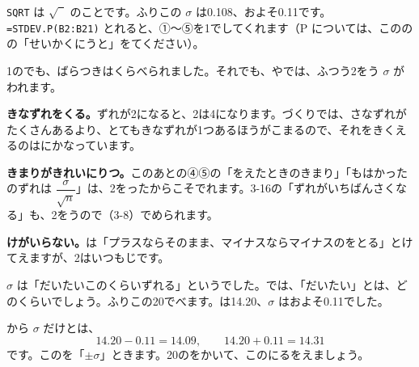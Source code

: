 \texttt{SQRT} は $\sqrt{\phantom{2}}$ のことです。ふりこの $\sigma$ は0.108、およそ0.11です。\texttt{=STDEV.P(B2:B21)} とれると、①〜⑤を1でしてくれます（P については、こののの「せいかくにうと」をてください）。

1のでも、ばらつきはくらべられました。それでも、やでは、ふつう2をう $\sigma$ がわれます。
\begin{enumerate}[label={\bkcircled[bkBlue]{\arabic*}}, leftmargin=2.4\zw, itemsep=1pt, topsep=2pt]
\item \textbf{きなずれをくる。}\quad ずれが2になると、2は4になります。づくりでは、さなずれがたくさんあるより、とてもきなずれが1つあるほうがこまるので、それをきくえるのはにかなっています。
\item \textbf{きまりがきれいにりつ。}\quad このあとの④⑤の「をえたときのきまり」「もはかったのずれは $\dfrac{\sigma}{\sqrt{n}}$」は、2をったからこそでれます。3-16の「ずれがいちばんさくなる」も、2をうので（3-8）でめられます。
\item \textbf{けがいらない。}\quad {}は「プラスならそのまま、マイナスならマイナスのをとる」とけてえますが、2はいつもじです。
\end{enumerate}


\leavevmode\label{bk:3-14:nanawari}$\sigma$ は「だいたいこのくらいずれる」というでした。では、「だいたい」とは、どのくらいでしょう。ふりこの20でべます。は14.20、$\sigma$ はおよそ0.11でした。

から $\sigma$ だけとは、
\[ 14.20-0.11=14.09,\qquad 14.20+0.11=14.31 \]
です。このを「$\pm\sigma$」ときます。20のをかいて、このにるをえましょう。

